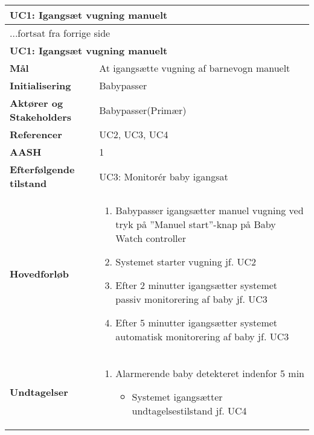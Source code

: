 \begin{center} \centering \label{kravspec:uc1}
	\begin{longtable}{|p{5cm}|p{9cm}|}  %
	\hline
		\multicolumn{2}{|l|}{\textbf{UC1: Igangsæt vugning manuelt}} \\\hline %
		\endfirsthead
		
		\multicolumn{2}{l}{...fortsat fra forrige side} \\ \hline %
		\multicolumn{2}{|l|}{\textbf{UC1: Igangsæt vugning manuelt}} \\\hline %
		\endhead	
		
		\textbf{Mål}							&At igangsætte vugning af barnevogn manuelt 		\\\hline
		\textbf{Initialisering}				&Babypasser		\\\hline
		\textbf{Aktører og Stakeholders}		&Babypasser(Primær)		\\\hline 
		\textbf{Referencer}					&UC2, UC3, UC4		\\\hline
		\textbf{AASH}						&1		\\\hline
		\textbf{Efterfølgende tilstand}		&UC3: Monitorér baby igangsat		\\\hline
		\textbf{Hovedforløb}					
			&\begin{enumerate}
	
				\item Babypasser igangsætter manuel vugning ved tryk på ''Manuel start''-knap på Baby Watch controller
				
				\item \label{kravspec:uc1_vugning}Systemet starter vugning jf. UC2
				
				\item \label{kravspec:uc1_timeout2}Efter 2 minutter igangsætter systemet passiv monitorering af baby jf. UC3			
								
				\item \label{kravspec:uc1_timeout5}Efter 5 minutter igangsætter systemet automatisk monitorering af baby jf. UC3	
				\newline [Und: \ref{kravspec:uc1_timeout5}.a Alarmerende baby detekteret indenfor 5 min]				
				
			\end{enumerate}
		\\\hline
		\textbf{Undtagelser}
			&\begin{enumerate}[label=\ref{kravspec:uc1_timeout5}.a]
			\item Alarmerende baby detekteret indenfor 5 min
					\begin{itemize}
					
					\item Systemet igangsætter undtagelsestilstand jf. UC4
					
					\end{itemize}
			\end{enumerate}
			
		\\\hline
	\end{longtable} 
\end{center}

